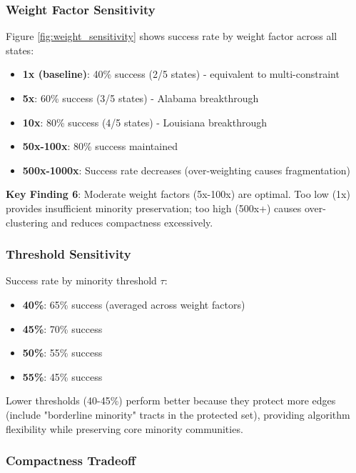 \subsubsection{Weight Factor Sensitivity}

Figure \ref{fig:weight_sensitivity} shows success rate by weight factor across all states:

\begin{itemize}
\item \textbf{1x (baseline)}: 40\% success (2/5 states) - equivalent to multi-constraint
\item \textbf{5x}: 60\% success (3/5 states) - Alabama breakthrough
\item \textbf{10x}: 80\% success (4/5 states) - Louisiana breakthrough
\item \textbf{50x-100x}: 80\% success maintained
\item \textbf{500x-1000x}: Success rate decreases (over-weighting causes fragmentation)
\end{itemize}

\textbf{Key Finding 6}: Moderate weight factors (5x-100x) are optimal. Too low (1x) provides insufficient minority preservation; too high (500x+) causes over-clustering and reduces compactness excessively.

\subsubsection{Threshold Sensitivity}

Success rate by minority threshold $\tau$:

\begin{itemize}
\item \textbf{40\%}: 65\% success (averaged across weight factors)
\item \textbf{45\%}: 70\% success
\item \textbf{50\%}: 55\% success
\item \textbf{55\%}: 45\% success
\end{itemize}

Lower thresholds (40-45\%) perform better because they protect more edges (include "borderline minority" tracts in the protected set), providing algorithm flexibility while preserving core minority communities.

\subsubsection{Compactness Tradeoff}

